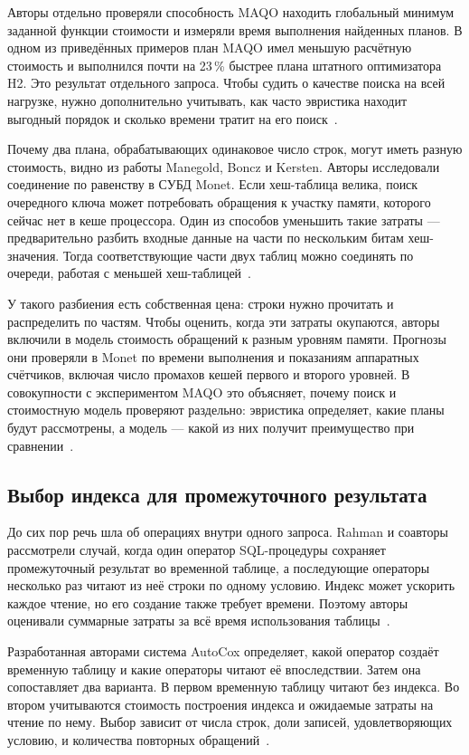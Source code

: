 \documentclass[a4paper, final]{article}
\begin{document}
	Авторы отдельно проверяли способность MAQO находить глобальный минимум заданной функции стоимости и измеряли время выполнения найденных планов. В одном из приведённых примеров план MAQO имел меньшую расчётную стоимость и выполнился почти на 23\,\% быстрее плана штатного оптимизатора H2. Это результат отдельного запроса. Чтобы судить о качестве поиска на всей нагрузке, нужно дополнительно учитывать, как часто эвристика находит выгодный порядок и сколько времени тратит на его поиск~\cite{goncalves2014}.
	
	Почему два плана, обрабатывающих одинаковое число строк, могут иметь разную стоимость, видно из работы Manegold, Boncz и Kersten. Авторы исследовали соединение по равенству в СУБД Monet. Если хеш-таблица велика, поиск очередного ключа может потребовать обращения к участку памяти, которого сейчас нет в кеше процессора. Один из способов уменьшить такие затраты --- предварительно разбить входные данные на части по нескольким битам хеш-значения. Тогда соответствующие части двух таблиц можно соединять по очереди, работая с меньшей хеш-таблицей~\cite{manegold2000}.
	
	У такого разбиения есть собственная цена: строки нужно прочитать и распределить по частям. Чтобы оценить, когда эти затраты окупаются, авторы включили в модель стоимость обращений к разным уровням памяти. Прогнозы они проверяли в Monet по времени выполнения и показаниям аппаратных счётчиков, включая число промахов кешей первого и второго уровней. В совокупности с экспериментом MAQO это объясняет, почему поиск и стоимостную модель проверяют раздельно: эвристика определяет, какие планы будут рассмотрены, а модель --- какой из них получит преимущество при сравнении~\cite{manegold2000,goncalves2014}.
	
	\subsection{Выбор индекса для промежуточного результата}
	
	До сих пор речь шла об операциях внутри одного запроса. Rahman и соавторы рассмотрели случай, когда один оператор SQL-процедуры сохраняет промежуточный результат во временной таблице, а последующие операторы несколько раз читают из неё строки по одному условию. Индекс может ускорить каждое чтение, но его создание также требует времени. Поэтому авторы оценивали суммарные затраты за всё время использования таблицы~\cite{rahman2026}.
	
	Разработанная авторами система AutoCox определяет, какой оператор создаёт временную таблицу и какие операторы читают её впоследствии. Затем она сопоставляет два варианта. В первом временную таблицу читают без индекса. Во втором учитываются стоимость построения индекса и ожидаемые затраты на чтение по нему. Выбор зависит от числа строк, доли записей, удовлетворяющих условию, и количества повторных обращений~\cite{rahman2026}.
	
\end{document}
